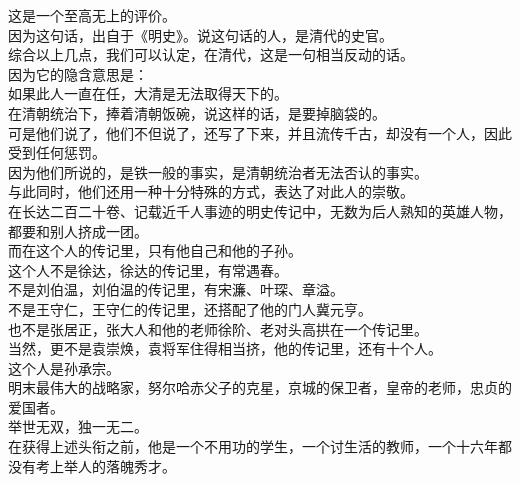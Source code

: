 \begin{multicols}{\theparacolNo}
这是一个至高无上的评价。\\

因为这句话，出自于《明史》。说这句话的人，是清代的史官。\\

综合以上几点，我们可以认定，在清代，这是一句相当反动的话。\\

因为它的隐含意思是：\\

如果此人一直在任，大清是无法取得天下的。\\

在清朝统治下，捧着清朝饭碗，说这样的话，是要掉脑袋的。\\

可是他们说了，他们不但说了，还写了下来，并且流传千古，却没有一个人，因此受到任何惩罚。\\

因为他们所说的，是铁一般的事实，是清朝统治者无法否认的事实。\\

与此同时，他们还用一种十分特殊的方式，表达了对此人的崇敬。\\

在长达二百二十卷、记载近千人事迹的明史传记中，无数为后人熟知的英雄人物，都要和别人挤成一团。\\

而在这个人的传记里，只有他自己和他的子孙。\\

这个人不是徐达，徐达的传记里，有常遇春。\\

不是刘伯温，刘伯温的传记里，有宋濂、叶琛、章溢。\\

不是王守仁，王守仁的传记里，还搭配了他的门人冀元亨。\\

也不是张居正，张大人和他的老师徐阶、老对头高拱在一个传记里。\\

当然，更不是袁崇焕，袁将军住得相当挤，他的传记里，还有十个人。\\

这个人是孙承宗。\\

明末最伟大的战略家，努尔哈赤父子的克星，京城的保卫者，皇帝的老师，忠贞的爱国者。\\

举世无双，独一无二。\\

在获得上述头衔之前，他是一个不用功的学生，一个讨生活的教师，一个十六年都没有考上举人的落魄秀才。\\

\ifnum{}
	\end{multicols}
\fi
\newpage
